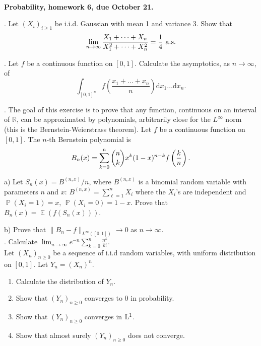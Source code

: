 \documentclass[11pt,reqno]{amsart}
\newcommand{\RR}{{\mathbb R}}
\DeclareMathOperator{\Prob}{\mathbb{P}}   %
\DeclareMathOperator{\E}{\mathbb{E}}      %
\newcommand{\1}{\mathds{1}}
\newcommand{\rd}{{\mathrm{d}}}            %
\theoremstyle{definition}
\theoremstyle{remark}
\numberwithin{equation}{section}
\begin{document}
~\vspace{-3cm}



\begin{center}
{\bf Probability, homework 6, due October 21.}
\end{center}
\vspace{0.5cm}
\small







. Let $(X_i)_{i\geq 1}$ be i.i.d. Gaussian with mean 1 and variance 3. Show that
$$
\lim_{n\to\infty}\frac{X_1+\dots+X_n}{X_1^2+\dots+X_n^2}=\frac{1}{4}\ {\rm a.s.}
$$

. Let $f$ be a continuous function on $[0,1]$. Calculate the asymptotics, as $n\to\infty$, of 
$$
\int_{[0,1]^n}f\left(\frac{x_1+\dots+x_n}{n}\right)\rd x_1\dots\rd x_n.
$$



. The goal of this exercise is to prove that any  function, continuous on an interval of $\RR$, 
can be approximated by polynomials, arbitrarily close for the $L^\infty$ norm (this is the Bernstein-Weierstrass theorem).  
Let $f$ be a continuous function on $[0,1]$. The $n$-th Bernstein polynomial is
$$
B_n(x)=\sum_{k=0}^n\dbinom{n}{k}x^k(1-x)^{n-k} f\left(\frac{k}{n}\right).
$$

a) Let $S_n(x)=B^{(n,x)}/n$, where $B^{(n,x)}$ is a binomial random variable with parameters $n$ and $x$:
$B^{(n,x)}=\sum_{\ell=1}^n X_i$ where the $X_i$'s are independent and $\Prob(X_i=1)=x$, $\Prob(X_i=0)=1-x$.
Prove that $B_n(x)=\E(f(S_n(x)))$.

b) Prove that $\|B_n-f\|_{L^\infty([0,1])}\to 0$ as $n\to\infty$.\\





. Calculate
$
\lim_{n\to\infty} e^{-n}\sum_{k=0}^n\frac{n^k}{k!}.
$\\


Let $(X_n)_{n\geq 0}$ be a sequence of i.i.d random variables, with uniform distribution on $[0,1]$. Let $Y_n=(X_n)^n$.
\begin{enumerate}
\item  Calculate the distribution of $Y_n$.
\item Show that $(Y_n)_{n\geq 0}$ converges to 0 in probability.
\item Show that $(Y_n)_{n\geq 0}$ converges in ${\rm L}^1$.
\item Show that almost surely  $(Y_n)_{n\geq 0}$ does not converge.
\end{enumerate}
\end{document}
